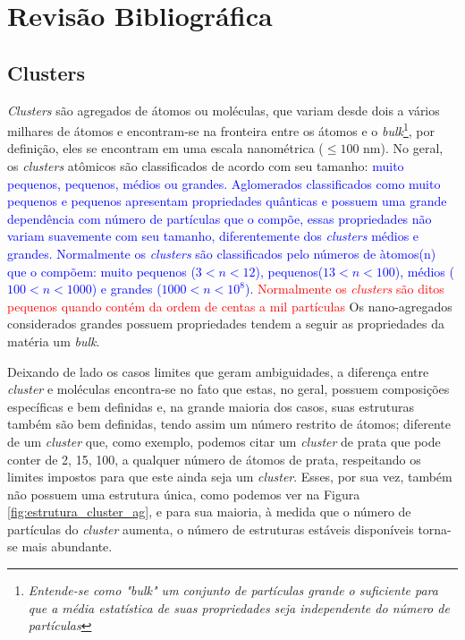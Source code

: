 \chapter{Revisão Bibliográfica}
\label{revisao_bibliografica}

\section{Clusters}
\label{c2-clusters}

\textit{Clusters} são agregados de átomos ou moléculas, que variam desde dois a vários milhares de átomos e encontram-se na fronteira entre os átomos e o \textit{bulk}\footnote{\textit{Entende-se como "bulk" um conjunto de partículas grande o suficiente para que a média estatística de suas propriedades seja independente do número de partículas\cite{bulk}}}\cite{Heer,Brack}, por definição, eles se encontram em uma escala nanométrica ($ \leqslant 100$ nm).
No geral, os \textit{clusters} atômicos são classificados de acordo com seu tamanho: \textcolor{blue}{ muito pequenos, pequenos, médios ou grandes. Aglomerados classificados como muito pequenos e pequenos apresentam propriedades quânticas e possuem uma grande dependência com número de partículas que o compõe, essas propriedades não variam suavemente com seu tamanho, diferentemente dos \textit{clusters} médios e grandes.
Normalmente os \textit{clusters} são classificados pelo números de àtomos(n) que o compõem: muito pequenos ($3<n<12$), pequenos($13<n<100$), médios ($100<n<1000$) e grandes ($1000<n<10^8$).}
\textcolor{red}{Normalmente os \textit{clusters} são ditos pequenos quando contém da ordem de centas a mil partículas} Os nano-agregados considerados grandes possuem propriedades tendem a seguir as propriedades da matéria um \textit{bulk}.


Deixando de lado os casos limites que geram ambiguidades, a diferença entre \textit{cluster} e moléculas encontra-se no fato que estas, no geral, possuem composições específicas e bem definidas e, na grande maioria dos casos, suas estruturas também são bem definidas, tendo  assim um número restrito de átomos; diferente de um \textit{cluster} que, como exemplo, podemos citar um \textit{cluster} de prata que pode conter de 2, 15, 100, a qualquer número de átomos de prata, respeitando os limites impostos para que este ainda seja um \textit{cluster}. Esses, por sua vez, também não possuem uma estrutura única, como podemos ver na Figura \ref{fig:estrutura_cluster_ag}, e para sua maioria, à medida que o número de partículas do \textit{cluster} aumenta, o número de estruturas estáveis disponíveis torna-se mais abundante. 

